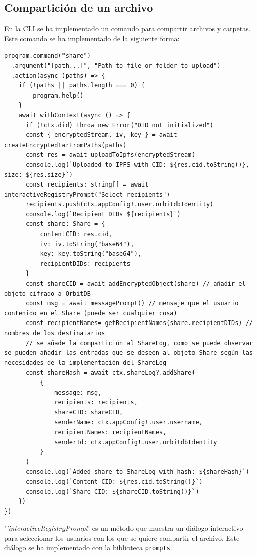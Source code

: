 \subsection{Compartición de un archivo}
En la CLI se ha implementado un comando para compartir archivos y carpetas. Este comando se ha implementado de la siguiente forma:
\begin{verbatim}
program.command("share")
  .argument("[path...]", "Path to file or folder to upload")
  .action(async (paths) => {
    if (!paths || paths.length === 0) {
        program.help()
    }
    await withContext(async () => {
      if (!ctx.did) throw new Error("DID not initialized")
      const { encryptedStream, iv, key } = await createEncryptedTarFromPaths(paths)
      const res = await uploadToIpfs(encryptedStream)
      console.log(`Uploaded to IPFS with CID: ${res.cid.toString()}, size: ${res.size}`)
      const recipients: string[] = await interactiveRegistryPrompt("Select recipients")
      recipients.push(ctx.appConfig!.user.orbitdbIdentity)
      console.log(`Recipient DIDs ${recipients}`)
      const share: Share = {
          contentCID: res.cid, 
          iv: iv.toString("base64"), 
          key: key.toString("base64"), 
          recipientDIDs: recipients
      }
      const shareCID = await addEncryptedObject(share) // añadir el objeto cifrado a OrbitDB
      const msg = await messagePrompt() // mensaje que el usuario contenido en el Share (puede ser cualquier cosa)
      const recipientNames= getRecipientNames(share.recipientDIDs) // nombres de los destinatarios
      // se añade la compartición al ShareLog, como se puede observar se pueden añadir las entradas que se deseen al objeto Share según las necesidades de la implementación del ShareLog
      const shareHash = await ctx.shareLog?.addShare(
          {
              message: msg,
              recipients: recipients,
              shareCID: shareCID,
              senderName: ctx.appConfig!.user.username,
              recipientNames: recipientNames, 
              senderId: ctx.appConfig!.user.orbitdbIdentity
          }
      ) 
      console.log(`Added share to ShareLog with hash: ${shareHash}`)
      console.log(`Content CID: ${res.cid.toString()}`)
      console.log(`Share CID: ${shareCID.toString()}`)
    })
})
\end{verbatim}

'\textit{'interactiveRegistryPrompt}' es un método que muestra un diálogo interactivo para seleccionar los usuarios con los que se quiere compartir el archivo. Este diálogo se ha implementado con la biblioteca \texttt{prompts}.

